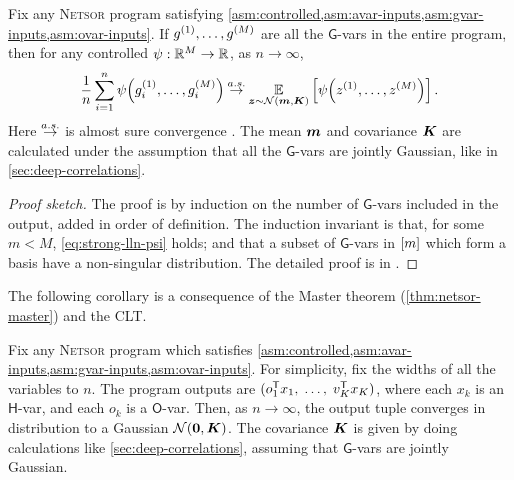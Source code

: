 \documentclass[accepted]{uai2021} %
\newcommand{\Netsor}{\textsc{Netsor}\xspace}
\newcommand{\Gva}{\mathsf{G}}
\newcommand{\Hva}{\mathsf{H}}
\newcommand{\Ova}{\mathsf{O}}
\newcommand{\chan}{i}
\newcommand{\0}{\boldsymbol{0}}
\newcommand{\1}{\boldsymbol{1}}
\begin{document}
\begin{theorem}[\Netsor master theorem, \citealp{yang2019wide}]
  Fix any \Netsor program satisfying \cref{asm:controlled,asm:avar-inputs,asm:gvar-inputs,asm:ovar-inputs}. If $g^{{\left( 1 \right)}},\dots,g^{{\left( M \right)}}$ are all the $\Gva$-vars in the entire program, then for any controlled $\psi : {\mathbb{R}}^{M} \to {\mathbb{R}}$, as $n\to\infty$,
  \begin{equation}
    \frac{1}{n}\sum_{\chan=1}^{n} \psi\bra{g\ssup{1}_{\chan},\dots,g\ssup{M}_{\chan}} \asconverges \Expect{\vz \sim \Normal{\vm, \mK}}{\psi\bra{z\ssup{1}, \dots, z\ssup{M}}}.
    \label{eq:strong-lln-psi}
  \end{equation}
  Here $\mathbin{\overset{a.s.}{\rightarrow}}$ is almost sure convergence \citep[sec.~5.2]{probability-theory-intro}. The mean ${\bm{m}}$ and covariance ${\bm{K}}$ are calculated under the assumption that all the $\Gva$-vars are jointly Gaussian, like in \cref{sec:deep-correlations}.
  \label{thm:netsor-master}
\end{theorem}
\begin{proof}[Proof sketch]
  The proof is by induction on the number of $\Gva$-vars included in the output,
  added in order of definition. The induction invariant is that, for some $m < M$, \cref{eq:strong-lln-psi} holds; and that a subset of $\Gva$-vars in $[m]$ which form a basis have a non-singular distribution. The detailed proof is in \citet[Appendix~H]{yang2019wide}.
\end{proof}

The following corollary is a consequence of the Master theorem
(\ref{thm:netsor-master}) and the \acl{CLT}.

\begin{corollary}
Fix any \Netsor program which satisfies \cref{asm:controlled,asm:avar-inputs,asm:gvar-inputs,asm:ovar-inputs}.
For simplicity, fix
  the widths of all the variables to $n$. The program outputs are $(o_{1}^{\mathsf{T}} x_1, \;\dots, \; v_K^{\mathsf{T}}
  x_K)$, where
  each $x_k$ is an $\Hva$-var, and each
    $o_k$ is a $\Ova$-var.
  Then, as $n \to \infty$, the output tuple
  converges in distribution to a Gaussian $\mathcal{N}{\left( {\boldsymbol{0}}, {\bm{K}} \right)}$.
  The covariance ${\bm{K}}$ is given by doing calculations like \cref{sec:deep-correlations}, assuming that $\Gva$-vars are jointly Gaussian.
  \label{corollary:netsor-gp}
\end{corollary}
\end{document}
